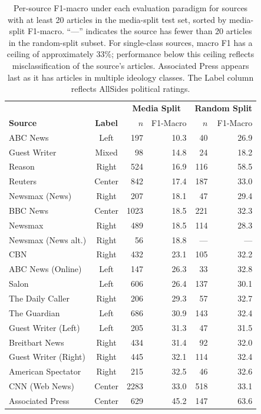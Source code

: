 \begin{table}[ht]
\centering
\small
\begin{tabular}{lcrrrr}
\toprule
 & & \multicolumn{2}{c}{\textbf{Media Split}} & \multicolumn{2}{c}{\textbf{Random Split}} \\
\textbf{Source} & \textbf{Label} & $n$ & F1-Macro & $n$ & F1-Macro \\
\midrule
ABC News           & Left   & 197  & 10.3 & 40  & 26.9 \\
Guest Writer       & Mixed  & 98   & 14.8 & 24  & 18.2 \\
Reason             & Right  & 524  & 16.9 & 116 & 58.5 \\
Reuters            & Center & 842  & 17.4 & 187 & 33.0 \\
Newsmax (News)     & Right  & 207  & 18.1 & 47  & 29.4 \\
BBC News           & Center & 1023 & 18.5 & 221 & 32.3 \\
Newsmax            & Right  & 489  & 18.5 & 114 & 28.3 \\
Newsmax (News alt.)& Right  & 56   & 18.8 & --- & ---  \\
CBN                & Right  & 432  & 23.1 & 105 & 32.2 \\
ABC News (Online)  & Left   & 147  & 26.3 & 33  & 32.8 \\
Salon              & Left   & 606  & 26.4 & 137 & 30.1 \\
The Daily Caller   & Right  & 206  & 29.3 & 57  & 32.7 \\
The Guardian       & Left   & 686  & 30.9 & 143 & 32.4 \\
Guest Writer (Left)& Left   & 205  & 31.3 & 47  & 31.5 \\
Breitbart News     & Right  & 434  & 31.4 & 92  & 32.0 \\
Guest Writer (Right)& Right & 445  & 32.1 & 114 & 32.4 \\
American Spectator & Right  & 215  & 32.5 & 46  & 32.6 \\
CNN (Web News)     & Center & 2283 & 33.0 & 518 & 33.1 \\
Associated Press   & Center & 629  & 45.2 & 147 & 63.6 \\
\bottomrule
\end{tabular}
\caption{Per-source F1-macro under each evaluation paradigm for sources with at least 20 articles in the media-split test set, sorted by media-split F1-macro. ``---'' indicates the source has fewer than 20 articles in the random-split subset. For single-class sources, macro F1 has a ceiling of approximately 33\%; performance below this ceiling reflects misclassification of the source's articles. Associated Press appears last as it has articles in multiple ideology classes. The Label column reflects AllSides political ratings.}
\label{tab:source_leakage}
\end{table}

